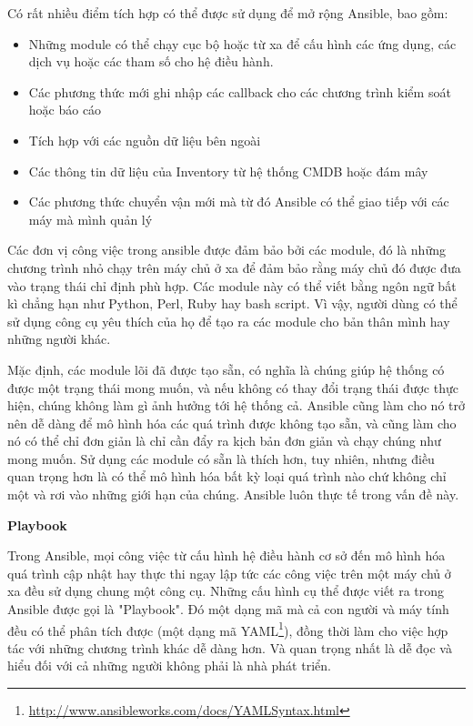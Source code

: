 Có rất nhiều điểm tích hợp có thể được sử dụng để mở rộng Ansible, bao gồm:

\begin{itemize}
\item Những module có thể chạy cục bộ hoặc từ xa để cấu hình các ứng dụng, các dịch vụ hoặc các tham số cho hệ điều hành.
\item Các phương thức mới ghi nhập các callback cho các chương trình kiểm soát hoặc báo cáo
\item Tích hợp với các nguồn dữ liệu bên ngoài
\item Các thông tin dữ liệu của Inventory từ hệ thống CMDB hoặc đám mây
\item Các phương thức chuyển vận mới mà từ đó Ansible có thể giao tiếp với các máy mà mình quản lý
\end{itemize}

Các đơn vị công việc trong ansible được đảm bảo bởi các module, đó là những chương trình nhỏ chạy trên máy chủ ở xa để đảm bảo rằng máy chủ đó được đưa vào trạng thái chỉ định phù hợp. Các module này có thể viết bằng ngôn ngữ bất kì chẳng hạn như Python, Perl, Ruby hay bash script. Vì vậy, người dùng có thể sử dụng công cụ yêu thích của họ để tạo ra các module cho bản thân mình hay những người khác.

Mặc định, các module lõi đã được tạo sẵn, có nghĩa là chúng giúp hệ thống có được một trạng thái mong muốn, và nếu không có thay đổi trạng thái được thực hiện, chúng không làm gì ảnh hưởng tới hệ thống cả. Ansible cũng làm cho nó trở nên dễ dàng để mô hình hóa các quá trình được không tạo sẵn, và cũng làm cho nó có thể chỉ đơn giản là chỉ cần đẩy ra kịch bản đơn giản và chạy chúng như mong muốn. Sử dụng các module có sẵn là thích hơn, tuy nhiên, nhưng điều quan trọng hơn là có thể mô hình hóa bất kỳ loại quá trình nào chứ không chỉ một và rơi vào những giới hạn của chúng. Ansible luôn thực tế trong vấn đề này.


\textbf{\large Playbook}


Trong Ansible, mọi công việc từ cấu hình hệ điều hành cơ sở đến mô hình hóa quá trình cập nhật hay thực thi ngay lập tức các công việc trên một máy chủ ở xa đều sử dụng chung một công cụ. Những cấu hình cụ thể được viết ra trong Ansible được gọi là "Playbook". Đó một dạng mã mà cả con người và máy tính đều có thể phân tích được (một dạng mã YAML\footnote{\url{http://www.ansibleworks.com/docs/YAMLSyntax.html}}), đồng thời làm cho việc hợp tác với những chương trình khác dễ dàng hơn. Và quan trọng nhất là dễ đọc và hiểu đối với cả những người không phải là nhà phát triển.

